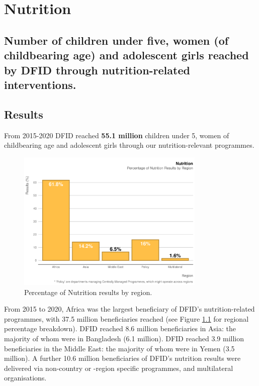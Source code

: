 \chapter{Nutrition}

\section*{Number of children under five, women (of childbearing age) and adolescent girls reached by DFID through nutrition-related interventions.}

\thispagestyle{empty}



\section{Results}

From 2015-2020 DFID reached \textbf{
55.1 million
} children under 5, women of childbearing age and adolescent girls through our nutrition-relevant programmes. %

\begin{figure}[htbp]
	\centering
\begin{knitrout}
\color{fgcolor}
\includegraphics[width=0.8\textwidth]{figs/nutrition_region_plot-1} 

\end{knitrout}
	\caption{Percentage of Nutrition results by region.}\label{fig:nutrition_region_plot}
\end{figure}


From 2015 to 2020, Africa was the largest beneficiary of DFID's nutrition-related programmes, with 37.5 million beneficiaries reached (see Figure \ref{fig:nutrition_region_plot} for regional percentage breakdown). %
DFID reached 8.6 million beneficiaries in Asia: the majority of whom were in Bangladesh (6.1 million). %
DFID reached 3.9 million beneficiaries in the Middle East: the majority of whom were in Yemen (3.5 million). %
A further 10.6 million beneficiaries of DFID's nutrition results were delivered via non-country or -region specific programmes, and multilateral organisations. %

